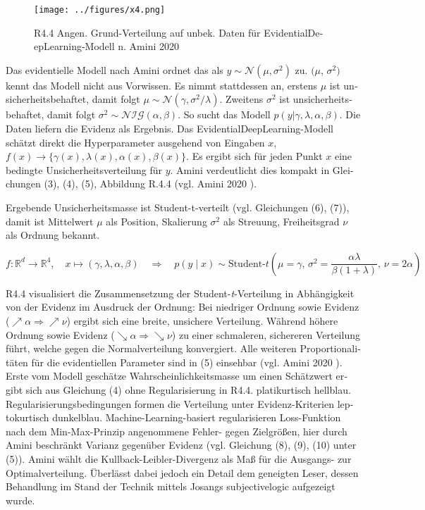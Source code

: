 \begin{otherlanguage}{ngerman}
\begin{figure}[!ht]
  \centering
  \texttt{[image: ../figures/x4.png]}
  \caption{R4.4 Angen. Grund-Verteilung auf unbek. Daten für \gls{EvidentialDeepLearning}-Modell n. Amini 2020}
\end{figure}

Das evidentielle Modell nach Amini ordnet das als $y \sim \mathcal{N}(\mu, \sigma^2)$ zu. $(\mu$, $\sigma^2)$ kennt das Modell nicht aus Vorwissen. Es nimmt stattdessen an, erstens $\mu$ ist unsicherheitsbehaftet, damit folgt $\mu \sim \mathcal{N}(\gamma, \sigma^{2} / \lambda)$. Zweitens $\sigma^{2}$ ist unsicherheitsbehaftet, damit folgt $\sigma^{2} \sim \mathcal{NIG}(\alpha, \beta)$. So sucht das Modell $p(y|\gamma,\lambda,\alpha,\beta)$. Die Daten liefern die Evidenz als Ergebnis. Das \gls{EvidentialDeepLearning}-Modell schätzt direkt die Hyperparameter ausgehend von Eingaben $x$, $f(x) \rightarrow \{ \gamma(x), \lambda(x), \alpha(x), \beta(x) \}$. Es ergibt sich für jeden Punkt $x$ eine bedingte Unsicherheitsverteilung für $y$. Amini verdeutlicht dies kompakt in Gleichungen (3), (4), (5), Abbildung R.4.4 (vgl. Amini 2020 \parencite{amini2020}). 

Ergebende Unsicherheitsmasse ist Student-t-verteilt (vgl. Gleichungen (6), (7)), damit ist Mittelwert $\mu$ als \glqq{}Position\grqq{}, Skalierung $\sigma^{2}$ als \glqq{}Streuung\grqq{}, Freiheitsgrad $\nu$ als \glqq{}Ordnung\grqq{} bekannt. 

\[
f : \mathbb{R}^d \to \mathbb{R}^4, \quad x \mapsto (\gamma, \lambda, \alpha, \beta) \quad \Rightarrow \quad p(y \mid x) \sim \text{Student-}t\left(\mu = \gamma,\, \sigma^2 = \frac{\alpha \lambda}{\beta (1 + \lambda)},\, \nu = 2\alpha\right)
\]

R4.4 visualisiert die Zusammensetzung der Student-\emph{t}-Verteilung in Abhängigkeit von der Evidenz im Ausdruck der Ordnung: Bei niedriger Ordnung sowie Evidenz (\(\nearrow \alpha \Rightarrow \nearrow \nu\)) ergibt sich eine breite, unsichere Verteilung. Während höhere Ordnung sowie Evidenz (\(\searrow \alpha \Rightarrow \searrow \nu\)) zu einer schmaleren, sichereren Verteilung führt, welche gegen die Normalverteilung konvergiert. Alle weiteren Proportionalitäten für die evidentiellen Parameter sind in (5) einsehbar (vgl. Amini 2020 \parencite{amini2020}). Erste vom Modell geschätze Wahrscheinlichkeitsmasse um einen Schätzwert ergibt sich aus Gleichung (4) ohne Regularisierung in R4.4. platikurtisch hellblau. Regularisierungsbedingungen formen die Verteilung unter Evidenz-Kriterien leptokurtisch dunkelblau. Machine-Learning-basiert regularisieren Loss-Funktion nach dem Min-Max-Prinzip angenommene Fehler- gegen Zielgrößen, hier durch Amini beschränkt Varianz gegenüber Evidenz (vgl. Gleichung (8), (9), (10) unter (5)). Amini wählt die Kullback-Leibler-Divergenz als Maß für die Ausgangs- zur Optimalverteilung. Überlässt dabei jedoch ein Detail dem geneigten Leser, dessen Behandlung im Stand der Technik mittels Josangs \gls{subjectivelogic} aufgezeigt wurde.


\end{otherlanguage}
